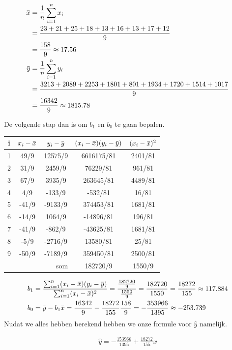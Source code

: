\documentclass[11pt]{report}
\newcommand{\overbar}[1]{\mkern 1.5mu\overline{\mkern-1.5mu#1\mkern-1.5mu}\mkern 1.5mu}
\newcommand{\lbr}{\hfill\break}
\begin{document}
\begin{equation*}
  \begin{split}
    \overbar{x} &= \frac{1}{n}\sum_{i=1}^nx_i\\
      &= \frac{23+21+25+18+13+16+13+17+12}{9}\\
      &= \frac{158}{9} \approx 17.56\\
    \overbar{y} &= \frac{1}{n}\sum_{i=1}^ny_i\\
     &= \frac{3213+2089+2253+1801+801+1934+1720+1514+1017}{9}\\
     &= \frac{16342}{9} \approx 1815.78\\
  \end{split}
\end{equation*}

\newpage

De volgende stap dan is om $b_1$ en $b_0$ te gaan bepalen.\lbr
\begin{center}
  \begin{tabular}{|c|c|c|c|c|}
    \hline
    i & $x_i - \overbar{x}$ & $y_i - \overbar{y}$ & $(x_i - \overbar{x})(y_i - \overbar{y})$ & $(x_i - \overbar{x})^2$ \\\hline
    1 & 49/9 & 12575/9 & 6616175/81 & 2401/81 \\\hline
    2 & 31/9 & 2459/9 & 76229/81 & 961/81 \\\hline
    3 & 67/9 & 3935/9 & 263645/81 & 4489/81 \\\hline
    4 & 4/9 & -133/9 & -532/81 & 16/81 \\\hline
    5 & -41/9 & -9133/9 & 374453/81 & 1681/81 \\\hline
    6 & -14/9 & 1064/9 & -14896/81 & 196/81 \\\hline
    7 & -41/9 & -862/9 & -43625/81 & 1681/81 \\\hline
    8 & -5/9 & -2716/9 & 13580/81 & 25/81 \\\hline
    9 & -50/9 & -7189/9 & 359450/81 & 2500/81 \\\hline\hline
    \multicolumn{3}{|r|}{som} & 182720/9 & 1550/9 \\\hline
  \end{tabular}
\end{center}
\begin{equation*}
  \begin{split}
      b_1 &= \frac{\sum_{i=1}^n(x_i - \overbar{x})(y_i - \overbar{y})}{\sum_{i=1}^n(x_i - \overbar{x})^2} = \frac{\frac{182720}{9}}{\frac{1550}{9}} = \frac{182720}{1550} = \frac{18272}{155} \approx 117.884\\
      b_0 &= \overbar{y} - b_1\overbar{x} = \frac{16342}{9} - \frac{18272}{155}\frac{158}{9} = -\frac{353966}{1395} \approx -253.739
  \end{split}
\end{equation*}
Nudat we alles hebben berekend hebben we onze formule voor $\hat{y}$ namelijk.
\begin{ceqn}
  \begin{align}
    \hat{y} = -\frac{153966}{1395} + \frac{18272}{155}x
    \label{calculatedExampleyhat}
  \end{align}
\end{ceqn}
\end{document}
